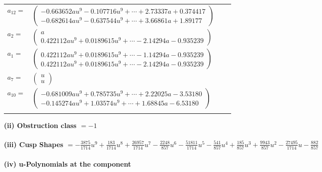 \documentclass[1p]{elsarticle_modified}
\theoremstyle{definition}
\begin{document}
\begin{tabular}{m{7pt} m{180pt} m{7pt} m{180pt} }
\flushright $a_{12}=$&$\begin{pmatrix}-0.663652 a u^{9}-0.107716 u^{9}+\cdots+2.73337 a+0.374417\\-0.682614 a u^{9}-0.637544 u^{9}+\cdots+3.66861 a+1.89177\end{pmatrix}$ \\
\flushright $a_{2}=$&$\begin{pmatrix}a\\0.422112 a u^{9}+0.0189615 u^{9}+\cdots-2.14294 a-0.935239\end{pmatrix}$ \\
\flushright $a_{1}=$&$\begin{pmatrix}0.422112 a u^{9}+0.0189615 u^{9}+\cdots-1.14294 a-0.935239\\0.422112 a u^{9}+0.0189615 u^{9}+\cdots-2.14294 a-0.935239\end{pmatrix}$ \\
\flushright $a_{7}=$&$\begin{pmatrix}u\\u\end{pmatrix}$ \\
\flushright $a_{10}=$&$\begin{pmatrix}-0.681009 a u^{9}+0.785735 u^{9}+\cdots+2.22025 a-3.53180\\-0.145274 a u^{9}+1.03574 u^{9}+\cdots+1.68845 a-6.53180\end{pmatrix}$\\&\end{tabular}
\flushleft \textbf{(ii) Obstruction class $= -1$}\\~\\
\flushleft \textbf{(iii) Cusp Shapes $= -\frac{3875}{1714} u^9+\frac{183}{1714} u^8+\frac{26957}{1714} u^7-\frac{2248}{857} u^6-\frac{51811}{1714} u^5-\frac{541}{857} u^4+\frac{185}{857} u^3+\frac{9943}{857} u^2-\frac{27495}{1714} u-\frac{882}{857}$}\\~\\
\newpage\renewcommand{\arraystretch}{1}
\flushleft \textbf{(iv) u-Polynomials at the component}\newline \\
\end{document}
